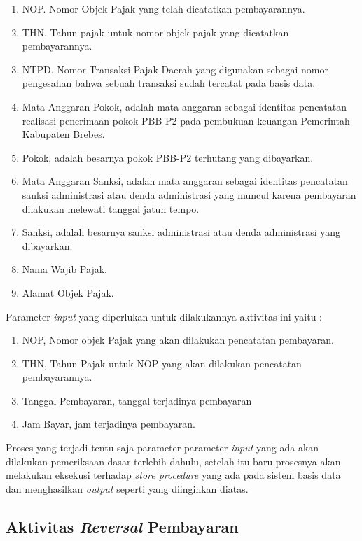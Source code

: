 \documentclass[pdftex,12pt, oneside]{article}
\begin{document}
\begin{enumerate}[1.]
  \item NOP. Nomor Objek Pajak yang telah dicatatkan pembayarannya.
  \item THN. Tahun pajak untuk nomor objek pajak yang dicatatkan pembayarannya.
  \item NTPD. Nomor Transaksi Pajak Daerah yang digunakan sebagai nomor pengesahan bahwa sebuah transaksi sudah tercatat pada basis data.
  \item Mata Anggaran Pokok, adalah mata anggaran sebagai identitas pencatatan realisasi penerimaan pokok PBB-P2 pada pembukuan keuangan Pemerintah Kabupaten Brebes.
  \item Pokok, adalah besarnya pokok PBB-P2 terhutang yang dibayarkan.
  \item Mata Anggaran Sanksi, adalah mata anggaran sebagai identitas pencatatan sanksi administrasi atau denda administrasi yang muncul karena pembayaran dilakukan melewati tanggal jatuh tempo.
  \item Sanksi, adalah besarnya sanksi administrasi atau denda administrasi yang dibayarkan.
  \item Nama Wajib Pajak.
  \item Alamat Objek Pajak.
\end{enumerate}

Parameter \textit{input} yang diperlukan untuk dilakukannya aktivitas ini yaitu :

\begin{enumerate}[1.]
  \item NOP, Nomor objek Pajak yang akan dilakukan pencatatan pembayaran.
  \item THN, Tahun Pajak untuk NOP yang akan dilakukan pencatatan pembayarannya.
  \item Tanggal Pembayaran, tanggal terjadinya pembayaran
  \item Jam Bayar, jam terjadinya pembayaran.
\end{enumerate}

Proses yang terjadi tentu saja parameter-parameter \textit{input} yang ada akan dilakukan pemeriksaan dasar terlebih dahulu, setelah itu baru prosesnya akan melakukan eksekusi terhadap \textit{store procedure} yang ada pada sistem basis data dan menghasilkan \textit{output} seperti yang diinginkan diatas.

\subsection{Aktivitas \textit{Reversal} Pembayaran}
\end{document}
